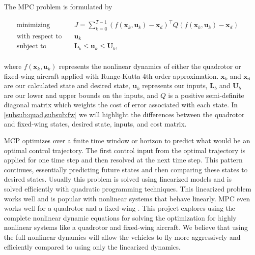 \documentclass[letterpaper, 10 pt, conference]{ieeeconf}  %
\begin{document}
	
	The MPC problem is formulated by
	
	\begin{equation}
	\label{eq:objective}
	\begin{aligned}
	\text{minimizing} & \quad J= \sum_{k=0}^{T-1} (f(\mathbf{x}_k,\mathbf{u}_k)-\mathbf{x}_{d})^{\top} Q (f(\mathbf{x}_k,\mathbf{u}_k)-\mathbf{x}_{d}) \\
	\text{with respect to} & \quad \mathbf{u}_k  \\
	\text{subject to} & \quad \mathbf{L}_b \le \mathbf{u}_k \le \mathbf{U}_b, \\
	\end{aligned}
	\end{equation}
	
	
	where $f(\mathbf{x}_k,\mathbf{u}_k)$ represents the nonlinear dynamics of either the quadrotor or fixed-wing aircraft applied with Runge-Kutta 4th order approximation. $\mathbf{x}_k$ and $\mathbf{x}_{d}$ are our calculated state and desired state, $\mathbf{u}_k$ represents our inputs, $\mathbf{L}_b$ and $\mathbf{U}_b$ are our lower and upper bounds on the inputs, and $Q$ is a positive semi-definite diagonal matrix which weights the cost of error associated with each state. In \cref{subsub:quad,subsub:fw} we will highlight the differences between the quadrotor and fixed-wing states, desired state, inputs, and cost matrix.
	
	MCP optimizes over a finite time window or horizon to predict what would be an optimal control trajectory. The first control input from the optimal trajectory is applied for one time step and then resolved at the next time step. This pattern continues, essentially predicting future states and then comparing these states to desired states. Usually this problem is solved using linearized models and is solved efficiently with quadratic programming techniques. This linearized problem works well and is popular with nonlinear systems that behave linearly. MPC even works well for a quadrotor \cite{bangura2014real} and a fixed-wing \cite{stastny2017nonlinear}. This project explores using the complete nonlinear dynamic equations for solving the optimization for highly nonlinear systems like a quadrotor and fixed-wing aircraft. We believe that using the full nonlinear dynamics will allow the vehicles to fly more aggressively and efficiently compared to using only the linearized dynamics. 
	
	
\end{document}
